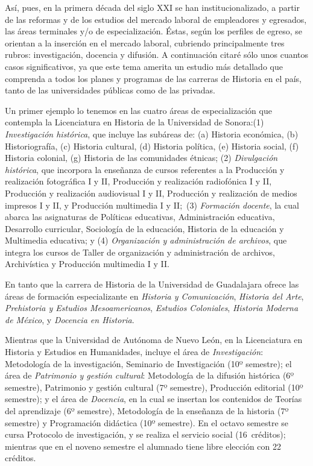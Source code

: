 Así, pues, en la primera década del siglo XXI se han institucionalizado, a
partir de las reformas y de los estudios del mercado laboral \textemdash{}de
empleadores y egresados\textemdash{}, las áreas terminales y\slash{}o de especialización.
Éstas, según los perfiles de egreso, se orientan a la inserción en el
mercado laboral, cubriendo principalmente tres rubros: investigación, docencia y difusión. A continuación citaré sólo unos cuantos casos significativos, ya que este tema amerita un estudio más detallado que comprenda a todos los planes y programas de las carreras de Historia en el país, tanto de las universidades públicas como de las privadas.

Un primer ejemplo lo tenemos en las cuatro áreas de especialización que contempla la Licenciatura en Historia de la Universidad de Sonora:\linebreak (1)
\textit{Investigación histórica}, que incluye las subáreas de: (a) Historia
económica, (b) Historiografía,  (c) Historia cultural, (d) Historia política,
(e) Historia social, (f) Historia colonial, (g) Historia de las comunidades
étnicas; (2) \textit{Divulgación histórica}, que incorpora la enseñanza de
cursos referentes a la Producción y realización fotográfica I y II,
Producción y realización radiofónica I y II, Producción y realización
audiovisual I y II, Producción y realización de medios impresos I y II, y
Producción multimedia I y II;\ (3) \textit{Formación docente}, la cual abarca las
asignaturas de Políticas educativas, Administración educativa, Desarrollo
curricular, Sociología de la educación, Historia de la educación y
Multimedia educativa; y (4) \textit{Organización y administración de
archivos}, que integra los cursos de Taller de organización y
administración de archivos, Archivística y Producción multimedia I y II\@.

En tanto que la carrera de Historia de la Universidad de Guadalajara ofrece
las áreas de formación especializante en \textit{Historia y Comunicación},
\textit{Historia del Arte}, \textit{Prehistoria y Estudios Mesoamericanos},
\textit{Estudios Coloniales}, \textit{Historia Moderna de México}, y
\textit{Docencia en Historia}.

\enlargethispage{1\baselineskip}
Mientras que la Universidad de Autónoma de Nuevo León, en la Licenciatura en
Historia y Estudios en Humanidades, incluye el área de
\textit{Investigación}: Metodología de la investigación, Seminario de
Investigación (10º semestre); el área de \textit{Patrimonio y gestión
cultural}: Metodología de la difusión histórica (6º semestre), Patrimonio y
gestión cultural (7º semestre), Producción editorial (10º semestre); y 
el área de \textit{Docencia}, en la cual se insertan los contenidos de Teorías
del aprendizaje (6º semestre), Metodología de la enseñanza de la historia
(7º semestre) y Programación didáctica (10º semestre). En el octavo semestre se 
cursa Protocolo de investigación, y se realiza el servicio social (16~créditos); 
mientras que en el noveno semestre el alumnado tiene libre elección con 22 créditos.

